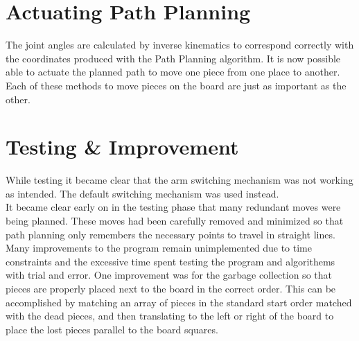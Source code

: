 \documentclass[11pt,a4paper]{article}
\begin{document}
\section{Actuating Path Planning}
The joint angles are calculated by inverse kinematics to correspond correctly with the coordinates produced with the Path Planning algorithm. It is now possible able to actuate the planned path to move one piece from one place to another. Each of these methods to move pieces on the board are just as important as the other.

\section{Testing \& Improvement}

While testing it became clear that the arm switching mechanism was not working as intended. The default switching mechanism was used instead.\\ It became clear early on in the testing phase that many redundant moves were being planned. These moves had been carefully removed and minimized so that path planning only remembers the necessary points to travel in straight lines.\\
\noindent
Many improvements to the program remain unimplemented due to time constraints and the excessive time spent testing the program and algorithems with trial and error. One improvement was for the garbage collection so that pieces are properly placed next to the board in the correct order. This can be accomplished by matching an array of pieces in the standard start order matched with the dead pieces, and then translating to the left or right of the board to place the lost pieces parallel to the board squares.\\



\end{document}
